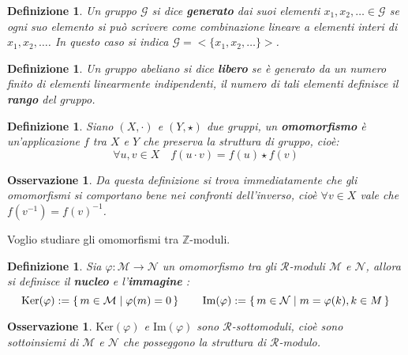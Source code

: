 \documentclass[10pt, twoside=false, x11names]{scrbook}
\newtheorem{osservation}[theorem]{Osservazione}
\newtheorem{definition}[theorem]{Definizione}
\newcommand{\R}{\mathcal{R}}
\newcommand{\M}{\mathcal{M}}
\newcommand{\N}{\mathcal{N}}
\newcommand{\Z}{\mathbb{Z}}
\newcommand{\im}[1]{\mathrm{Im}( #1 )}
\renewcommand{\ker}[1]{\mathrm{Ker}( #1)}
\renewcommand{\phi}{\varphi}
\begin{document}
\begin{definition}
  Un gruppo $ \mathcal{G} $ si dice \textbf{generato}
  dai suoi elementi $ x_1, x_2, \dots \in \mathcal{G} $ se
  ogni suo elemento si può scrivere come combinazione lineare a elementi interi di $ x_1, x_2, \dots $.
  In questo caso si indica $ \mathcal{G} = < \{ x_1, x_2, \dots \} > $.
\end{definition}

\begin{definition}
  Un gruppo abeliano si dice \textbf{libero}\index{$ \Z $-modulo libero} se è generato
  da un numero finito di elementi linearmente indipendenti, il numero di tali elementi
  definisce il \textbf{rango} del gruppo.
\end{definition}

\begin{definition}
  Siano $ (X, \cdot) $ e $ (Y, \star) $ due gruppi, un \textbf{omomorfismo}  è un'applicazione $ f $
  tra $ X $ e $ Y $ che preserva la struttura di gruppo, cioè:
  \[
    \forall u,v \in X \quad f(u \cdot v) = f(u) \star f(v)
  \]
\end{definition}

\begin{osservation}
  Da questa definizione si trova immediatamente che gli omomorfismi si comportano bene nei
  confronti dell'inverso, cioè $ \forall v \in X $ vale che $ f(v^{-1}) = {f(v)}^{-1} $.
\end{osservation}

Voglio studiare gli omomorfismi tra $ \Z $-moduli.

\begin{definition}
  Sia $ \phi: \M \to \N $ un omomorfismo tra gli $ \R $-moduli $ \M $ e $ \N $,
  allora si definisce il \textbf{nucleo}  e l'\textbf{immagine} :
  \[
    \ker {\phi} := \set{ m \in \M | \phi(m) = 0}  \qquad  \im{\phi} := \set{ m \in \N | m=\phi(k) , k \in  M}
  \]
\end{definition}

\begin{osservation}
  $ \ker{\phi} $ e $ \im{\phi} $ sono $ \R $-sottomoduli, cioè sono sottoinsiemi di $ \M $ e $ \N $
  che posseggono la struttura di $ \R $-modulo.
\end{osservation}
\end{document}
